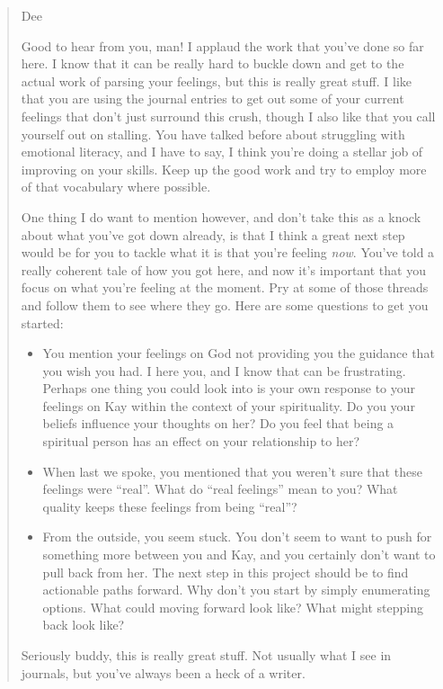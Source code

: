 \begin{quote}
Dee

Good to hear from you, man! I applaud the work that you've done so far here. I know that it can be really hard to buckle down and get to the actual work of parsing your feelings, but this is really great stuff. I like that you are using the journal entries to get out some of your current feelings that don't just surround this crush, though I also like that you call yourself out on stalling. You have talked before about struggling with emotional literacy, and I have to say, I think you're doing a stellar job of improving on your skills. Keep up the good work and try to employ more of that vocabulary where possible.

One thing I do want to mention however, and don't take this as a knock about what you've got down already, is that I think a great next step would be for you to tackle what it is that you're feeling \emph{now}. You've told a really coherent tale of how you got here, and now it's important that you focus on what you're feeling at the moment. Pry at some of those threads and follow them to see where they go. Here are some questions to get you started:

\begin{itemize}
\tightlist
\item
  You mention your feelings on God not providing you the guidance that you wish you had. I here you, and I know that can be frustrating. Perhaps one thing you could look into is your own response to your feelings on Kay within the context of your spirituality. Do you your beliefs influence your thoughts on her? Do you feel that being a spiritual person has an effect on your relationship to her?
\item
  When last we spoke, you mentioned that you weren't sure that these feelings were ``real''. What do ``real feelings'' mean to you? What quality keeps these feelings from being ``real''?
\item
  From the outside, you seem stuck. You don't seem to want to push for something more between you and Kay, and you certainly don't want to pull back from her. The next step in this project should be to find actionable paths forward. Why don't you start by simply enumerating options. What could moving forward look like? What might stepping back look like?
\end{itemize}

Seriously buddy, this is really great stuff. Not usually what I see in journals, but you've always been a heck of a writer.


\end{quote}
